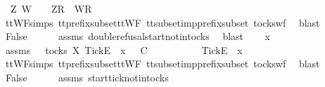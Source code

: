 \ {\isasymsigma}{\isacharprime}\ Z\ W\ \ {\isachardoublequoteopen}{\isasymsigma}\ {\isacharequal}\ {\isacharbrackleft}Z{\isacharbrackright}\isactrlsub R\ {\isacharhash}\ {\isacharbrackleft}W{\isacharbrackright}\isactrlsub R\ {\isacharhash}\ {\isasymsigma}{\isacharprime}{\isachardoublequoteclose}\isanewline
\ \ \ \ \isamarkupfalse%
\ ttWF{\isachardot}simps{\isacharparenleft}{}{}{\isacharparenright}\ tt{\isacharunderscore}prefix{\isacharunderscore}subset{\isacharunderscore}ttWF\ tt{\isacharunderscore}subset{\isacharunderscore}imp{\isacharunderscore}prefix{\isacharunderscore}subset\ tocks{\isacharunderscore}wf\ \isamarkupfalse%
\ blast\isanewline
\ \ \isamarkupfalse%
\ \isamarkupfalse%
\ False\isanewline
\ \ \ \ \isamarkupfalse%
\ assms{\isacharparenleft}{}{\isacharparenright}\ double{\isacharunderscore}refusal{\isacharunderscore}start{\isacharunderscore}notin{\isacharunderscore}tocks\ \isamarkupfalse%
\ blast\isanewline
{}\isamarkupfalse%
\isanewline
\ \ \isamarkupfalse%
\ x\ {\isasymrho}\ {\isasymsigma}\isanewline
\ \ \isamarkupfalse%
\ assms{\isacharcolon}\ {\isachardoublequoteopen}{\isasymsigma}\ {\isasymin}\ tocks\ X{\isachardoublequoteclose}\ {\isachardoublequoteopen}{\isacharbrackleft}Tick{\isacharbrackright}\isactrlsub E\ {\isacharhash}\ x\ {\isacharhash}\ {\isasymrho}\ {\isasymsubseteq}\isactrlsub C\ {\isasymsigma}{\isachardoublequoteclose}\isanewline
\ \ \isamarkupfalse%
\ \isamarkupfalse%
\ {\isasymsigma}{\isacharprime}\ \ {\isachardoublequoteopen}{\isasymsigma}\ {\isacharequal}\ {\isacharbrackleft}Tick{\isacharbrackright}\isactrlsub E\ {\isacharhash}\ x\ {\isacharhash}\ {\isasymsigma}{\isacharprime}{\isachardoublequoteclose}\isanewline
\ \ \ \ \isamarkupfalse%
\ ttWF{\isachardot}simps{\isacharparenleft}{}{\isacharparenright}\ tt{\isacharunderscore}prefix{\isacharunderscore}subset{\isacharunderscore}ttWF\ tt{\isacharunderscore}subset{\isacharunderscore}imp{\isacharunderscore}prefix{\isacharunderscore}subset\ tocks{\isacharunderscore}wf\ \isamarkupfalse%
\ blast\isanewline
\ \ \isamarkupfalse%
\ \isamarkupfalse%
\ False\isanewline
\ \ \ \ \isamarkupfalse%
\ assms{\isacharparenleft}{}{\isacharparenright}\ start{\isacharunderscore}tick{\isacharunderscore}notin{\isacharunderscore}tocks\ \isamarkupfalse%
